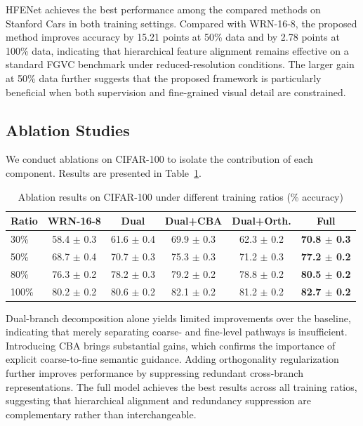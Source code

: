 \documentclass[pdflatex,iicol,sn-mathphys-num]{sn-jnl}
\theoremstyle{thmstyleone}%
\theoremstyle{thmstyletwo}%
\theoremstyle{thmstylethree}%
\begin{document}
HFENet achieves the best performance among the compared methods on Stanford Cars in both training settings. Compared with WRN-16-8, the proposed method improves accuracy by 15.21 points at 50\% data and by 2.78 points at 100\% data, indicating that hierarchical feature alignment remains effective on a standard FGVC benchmark under reduced-resolution conditions. The larger gain at 50\% data further suggests that the proposed framework is particularly beneficial when both supervision and fine-grained visual detail are constrained.

\subsection{Ablation Studies}
We conduct ablations on CIFAR-100 to isolate the contribution of each component. Results are presented in Table~\ref{tab:ablation_all}.

\begin{table}[h]
\centering
\caption{Ablation results on CIFAR-100 under different training ratios (\% accuracy)}
\label{tab:ablation_all}
\small
\setlength{\tabcolsep}{4pt}
\renewcommand{\arraystretch}{1.05}
\begin{tabular}{@{}lccccc@{}}
\toprule
\textbf{Ratio} & \textbf{WRN-16-8} & \textbf{Dual} & \textbf{Dual+CBA} & \textbf{Dual+Orth.} & \textbf{Full} \\
\midrule
30\%  & 58.4 $\pm$ 0.3 & 61.6 $\pm$ 0.4 & 69.9 $\pm$ 0.3 & 62.3 $\pm$ 0.2 & \textbf{70.8 $\pm$ 0.3} \\
50\%  & 68.7 $\pm$ 0.4 & 70.7 $\pm$ 0.3 & 75.3 $\pm$ 0.3 & 71.2 $\pm$ 0.3 & \textbf{77.2 $\pm$ 0.2} \\
80\%  & 76.3 $\pm$ 0.2 & 78.2 $\pm$ 0.3 & 79.2 $\pm$ 0.2 & 78.8 $\pm$ 0.2 & \textbf{80.5 $\pm$ 0.2} \\
100\% & 80.2 $\pm$ 0.2 & 80.6 $\pm$ 0.2 & 82.1 $\pm$ 0.2 & 81.2 $\pm$ 0.2 & \textbf{82.7 $\pm$ 0.2} \\
\bottomrule
\end{tabular}
\end{table}

Dual-branch decomposition alone yields limited improvements over the baseline, indicating that merely separating coarse- and fine-level pathways is insufficient. 
Introducing CBA brings substantial gains, which confirms the importance of explicit coarse-to-fine semantic guidance. 
Adding orthogonality regularization further improves performance by suppressing redundant cross-branch representations. 
The full model achieves the best results across all training ratios, suggesting that hierarchical alignment and redundancy suppression are complementary rather than interchangeable.
\end{document}
